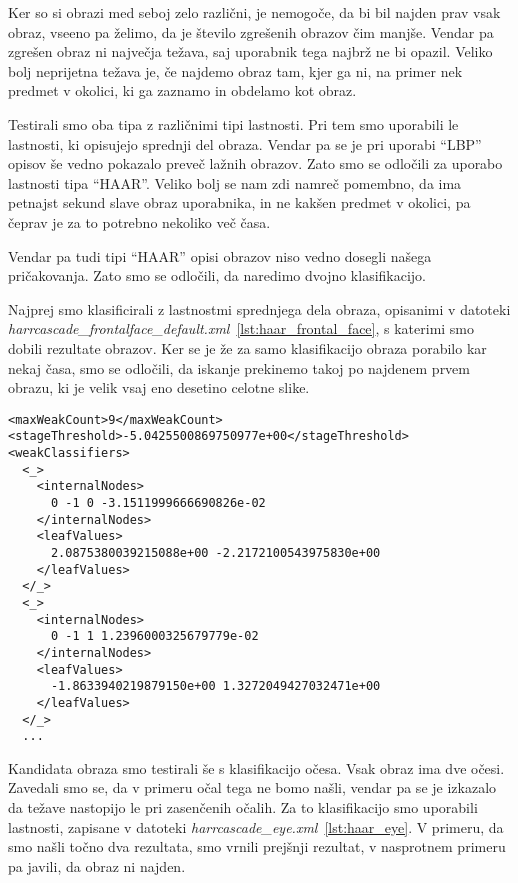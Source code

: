 Ker so si obrazi med seboj zelo različni, je nemogoče, da bi bil najden prav
vsak obraz, vseeno pa želimo, da je število zgrešenih obrazov čim manjše.
Vendar pa zgrešen obraz ni največja težava, saj uporabnik tega najbrž ne bi
opazil. Veliko bolj neprijetna težava je, če najdemo obraz tam, kjer ga ni, na
primer nek predmet v okolici, ki ga zaznamo in obdelamo kot obraz.

Testirali smo oba tipa z različnimi tipi lastnosti. Pri tem smo uporabili le
lastnosti, ki opisujejo sprednji del obraza. Vendar pa se je pri uporabi
``LBP'' opisov še vedno pokazalo preveč lažnih obrazov. Zato smo se odločili
za uporabo lastnosti tipa ``HAAR''. Veliko bolj se nam zdi namreč pomembno, da
ima petnajst sekund slave obraz uporabnika, in ne kakšen predmet v okolici, pa
čeprav je za to potrebno nekoliko več časa.

Vendar pa tudi tipi ``HAAR'' opisi obrazov niso vedno dosegli našega
pričakovanja. Zato smo se odločili, da naredimo dvojno klasifikacijo.

Najprej smo klasificirali z lastnostmi sprednjega dela obraza, opisanimi v
datoteki \textit{harrcascade\_frontalface\_default.xml}~\ref{lst:haar_frontal_face},
s katerimi smo dobili rezultate obrazov. Ker se je že za samo klasifikacijo
obraza porabilo kar nekaj časa, smo se odločili, da iskanje prekinemo takoj po
najdenem prvem obrazu, ki je velik vsaj eno desetino celotne slike.

\pagebreak %
\begin{lstlisting}[label=lst:haar_frontal_face, caption=Izsek iz datoteke harrcascade\_frontalface\_default.xml]
<maxWeakCount>9</maxWeakCount>
<stageThreshold>-5.0425500869750977e+00</stageThreshold>
<weakClassifiers>
  <_>
    <internalNodes>
      0 -1 0 -3.1511999666690826e-02
    </internalNodes>
    <leafValues>
      2.0875380039215088e+00 -2.2172100543975830e+00
    </leafValues>
  </_>
  <_>
    <internalNodes>
      0 -1 1 1.2396000325679779e-02
    </internalNodes>
    <leafValues>
      -1.8633940219879150e+00 1.3272049427032471e+00
    </leafValues>
  </_>
  ...
\end{lstlisting}

Kandidata obraza smo testirali še s klasifikacijo očesa. Vsak obraz ima dve
očesi. Zavedali smo se, da v primeru očal tega ne bomo našli, vendar pa se je
izkazalo da težave nastopijo le pri zasenčenih očalih. Za to klasifikacijo smo
uporabili lastnosti, zapisane v datoteki \textit{harrcascade\_eye.xml}~\ref{lst:haar_eye}.
V primeru, da smo našli točno dva rezultata, smo vrnili prejšnji rezultat,
v nasprotnem primeru pa javili, da obraz ni najden.


